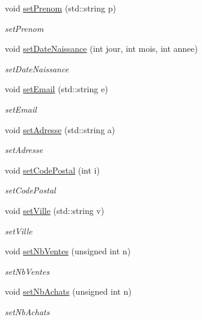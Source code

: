 \begin{DoxyCompactItemize}
void \hyperlink{class_utilisateur_a82c09ccdcb2449ee5a9938bb716938b6}{set\-Prenom} (std\-::string p)
\begin{DoxyCompactList}\small\item\em set\-Prenom \end{DoxyCompactList}\item 
void \hyperlink{class_utilisateur_a9cb5da21a0fa7c2900c95dfb9b6c70e8}{set\-Date\-Naissance} (int jour, int mois, int annee)
\begin{DoxyCompactList}\small\item\em set\-Date\-Naissance \end{DoxyCompactList}\item 
void \hyperlink{class_utilisateur_ab2e9b7718ba138421d5de19d29131165}{set\-Email} (std\-::string e)
\begin{DoxyCompactList}\small\item\em set\-Email \end{DoxyCompactList}\item 
void \hyperlink{class_utilisateur_afd7d9b7465cf7f0884e8701d785bd6c2}{set\-Adresse} (std\-::string a)
\begin{DoxyCompactList}\small\item\em set\-Adresse \end{DoxyCompactList}\item 
void \hyperlink{class_utilisateur_add56a5bbbb2507f5e1a5c6100c3c756a}{set\-Code\-Postal} (int i)
\begin{DoxyCompactList}\small\item\em set\-Code\-Postal \end{DoxyCompactList}\item 
void \hyperlink{class_utilisateur_a8a3b372a5f6086e009ebaf6135b570a9}{set\-Ville} (std\-::string v)
\begin{DoxyCompactList}\small\item\em set\-Ville \end{DoxyCompactList}\item 
void \hyperlink{class_utilisateur_a8d788360b66d30182485926d8082acef}{set\-Nb\-Ventes} (unsigned int n)
\begin{DoxyCompactList}\small\item\em set\-Nb\-Ventes \end{DoxyCompactList}\item 
void \hyperlink{class_utilisateur_aaff8554723c390a541f223065ba68f22}{set\-Nb\-Achats} (unsigned int n)
\begin{DoxyCompactList}\small\item\em set\-Nb\-Achats \end{DoxyCompactList}\item 

\end{DoxyCompactItemize}

